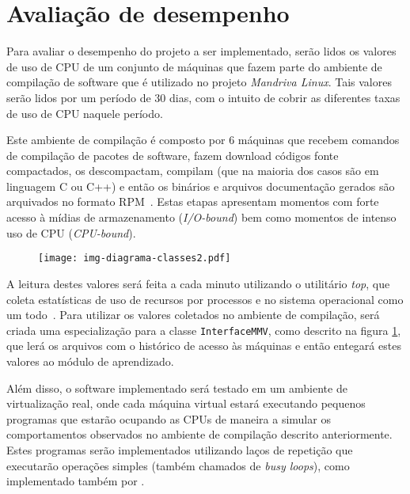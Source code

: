\section{Avaliação de desempenho}\label{sec:desemp}


Para avaliar o desempenho do projeto a ser implementado, serão lidos os
valores de uso de CPU de um conjunto de máquinas que fazem parte do
ambiente de compilação de software que é utilizado no projeto
\emph{Mandriva Linux}. Tais valores serão lidos por um período de 30 dias,
com o intuito de cobrir as diferentes taxas de uso de CPU naquele período.

Este ambiente de compilação é composto por $6$ máquinas que recebem
comandos de compilação de pacotes de software, fazem download códigos fonte
compactados, os descompactam, compilam (que na maioria dos casos são em
linguagem C ou C++) e então os binários e arquivos documentação gerados são
arquivados no formato RPM~\cite{ewing1996rpm}. Estas etapas apresentam
momentos com forte acesso à mídias de armazenamento (\emph{I/O-bound}) bem
como momentos de intenso uso de CPU (\emph{CPU-bound}).

\begin{figure}[htp]
\centering
\texttt{[image: img-diagrama-classes2.pdf]}
\label{fig:diagramaclasses2}
\end{figure}

A leitura destes valores será feita a cada minuto utilizando o utilitário
\emph{top}, que coleta estatísticas de uso de recursos por processos e no
sistema operacional como um todo~\cite{andresen2004monitoring}. Para utilizar
os valores coletados no ambiente de compilação, será criada uma especialização
para a classe \texttt{InterfaceMMV}, como descrito na figura
\ref{fig:diagramaclasses2}, que lerá os arquivos com o histórico de acesso às
máquinas e então entegará estes valores ao módulo de aprendizado.

Além disso, o software implementado será testado em um ambiente de
virtualização real, onde cada máquina virtual estará executando pequenos
programas que estarão ocupando as CPUs de maneira a simular os
comportamentos observados no ambiente de compilação descrito anteriormente.
Estes programas serão implementados utilizando laços de repetição que
executarão operações simples (também chamados de \emph{busy loops}), como
implementado também por .

